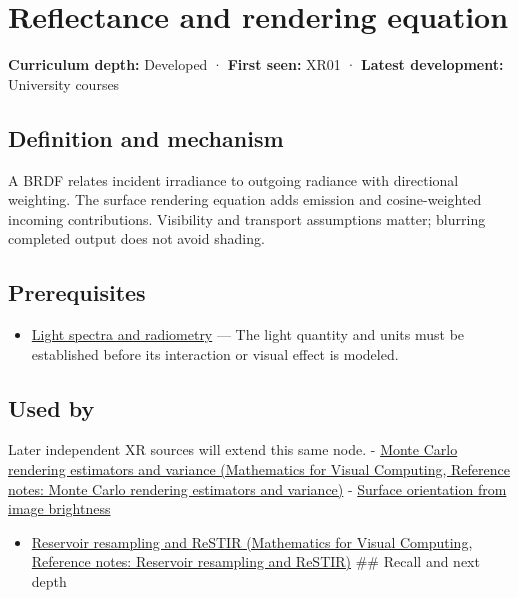 \hypertarget{appendix-96da0b153b77}{}\label{referencestart:appendix-96da0b153b77}
\section{Reflectance and rendering equation}\label{appendix-96da0b153b77-reflectance-and-rendering-equation}

\textbf{Curriculum depth:} Developed · \textbf{First seen:} XR01 · \textbf{Latest development:} University courses

\subsection{Definition and mechanism}\label{appendix-96da0b153b77-definition-and-mechanism}

A BRDF relates incident irradiance to outgoing radiance with directional weighting. The surface rendering equation adds emission and cosine-weighted incoming contributions. Visibility and transport assumptions matter; blurring completed output does not avoid shading.

\subsection{Prerequisites}\label{appendix-96da0b153b77-prerequisites}

\begin{itemize}
\tightlist
\item
  \hyperref[appendix-215c2570199b]{Light spectra and radiometry} --- The light quantity and units must be established before its interaction or visual effect is modeled.
\end{itemize}

\subsection{Used by}\label{appendix-96da0b153b77-used-by}

Later independent XR sources will extend this same node. - \href{../02-Mathematics-for-Visual-Computing/main.pdf\#nameddest=appendix-031e02bf28af}{Monte Carlo rendering estimators and variance (Mathematics for Visual Computing, Reference notes: Monte Carlo rendering estimators and variance)} - \hyperref[appendix-89b2d5b7c9e1]{Surface orientation from image brightness}

\begin{itemize}
\tightlist
\item
  \href{../02-Mathematics-for-Visual-Computing/main.pdf\#nameddest=appendix-68be451b78b1}{Reservoir resampling and ReSTIR (Mathematics for Visual Computing, Reference notes: Reservoir resampling and ReSTIR)} \#\# Recall and next depth
\end{itemize}

